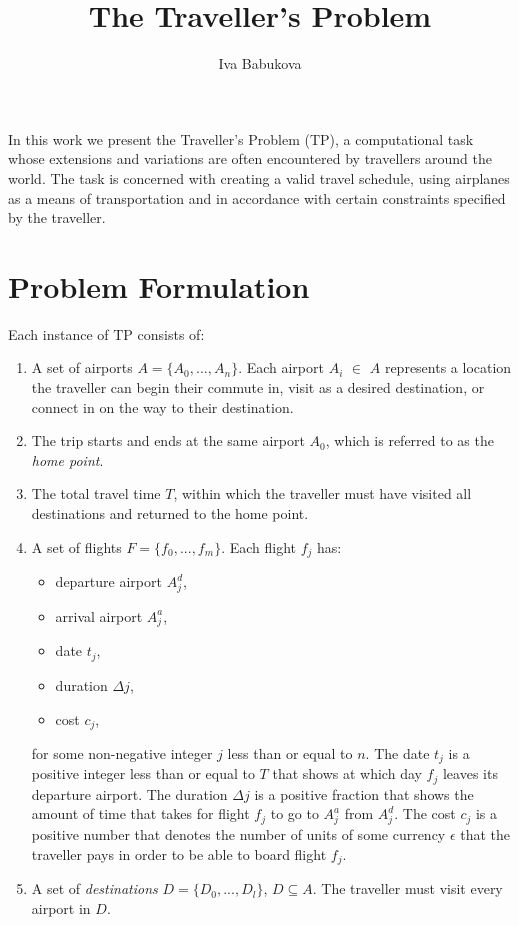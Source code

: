 \documentclass{article}
\title{The Traveller's Problem}
\author{Iva Babukova}
\theoremstyle{definition}
\begin{document}
\maketitle

In this work we present the Traveller's Problem (TP), a computational task whose extensions and variations are often encountered by travellers around the world. The task is concerned with creating a valid travel schedule, using airplanes as a means of transportation and in accordance with certain constraints specified by the traveller.

\section{Problem Formulation}
Each instance of TP consists of:

\begin{enumerate}
\item A set of airports $A = \{ A_{0},...,A_{n} \}$. Each airport $A_{i}$ $\in$ $A$ represents a location the traveller can begin their commute in, visit as a desired destination, or connect in on the way to their destination.

\item The trip starts and ends at the same airport $A_{0}$, which is referred to as the \textit{home point}.

\item The total travel time $T$, within which the traveller must have visited all destinations and returned to the home point.
 
\item A set of flights $F = \{ f_{0},...,f_{m} \}$. Each flight $f_{j}$ has:
\begin{itemize}
\item departure airport $A^{d}_{j}$,
\item arrival airport $A^{a}_{j}$,
\item date $t_{j}$,
\item duration $\Delta{j}$,
\item cost $c_{j}$,
\end{itemize} 
for some non-negative integer $j$ less than or equal to $n$.
The date $t_{j}$ is a positive integer less than or equal to $T$ that shows at which day $f_{j}$ leaves its departure airport. The duration $\Delta{j}$ is a positive fraction that shows the amount of time that takes for flight $f_{j}$ to go to $A^{a}_{j}$ from $A^{d}_{j}$. The cost $c_{j}$ is a positive number that denotes the number of units of some currency $\epsilon$ that the traveller pays in order to be able to board flight $f_{j}$.

\item A set of \textit{destinations} $D = \{ D_{0},...,D_{l} \}$, $D \subseteq A$. The traveller must visit every airport in $D$.
\end{enumerate}
\end{document}
